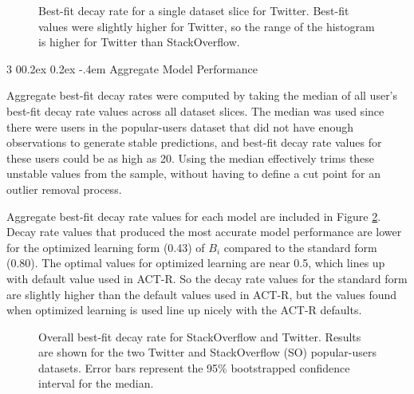 \documentclass[man,floatsintext,donotrepeattitle]{apa6}
\makeatletter
\renewcommand{\subsubsection}{%
  \@startsection
  {subsubsection}%
  {3}%
  {\parindent}%
  {0\baselineskip \@plus 0.2ex \@minus 0.2ex}%
  {-.4em}%
  {\normalfont\normalsize\bfseries\addperi}}
\makeatother
\begin{document}
\begin{figure}[!htbp]
  {%
    \setlength{\fboxsep}{0pt}%
    \setlength{\fboxrule}{1pt}%
    \hfill
    \hfill
    \caption{
      Best-fit decay rate for a single dataset slice for Twitter.
      Best-fit values were slightly higher for Twitter, so the range of the histogram is higher for Twitter than StackOverflow.
  }
    \label{figPriorTwitterHistDsOL}
  }%
\end{figure}

\subsubsection{Aggregate Model Performance}

Aggregate best-fit decay rates were computed by taking the median of all user's best-fit decay rate values across all dataset slices.
The median was used since there were users in the popular-users dataset that did not have enough observations to generate stable predictions, and best-fit decay rate values for these users could be as high as 20.
Using the median effectively trims these unstable values from the sample, without having to define a cut point for an outlier removal process.

Aggregate best-fit decay rate values for each model are included in Figure \ref{figPriorDecay}.
Decay rate values that produced the most accurate model performance are lower for the optimized learning form (\num{.43}) of $B_{i}$ compared to the standard form (\num{.80}).
The optimal values for optimized learning are near \num{0.5}, which lines up with default value used in ACT-R.
So the decay rate values for the standard form are slightly higher than the default values used in ACT-R, but the values found when optimized learning is used line up nicely with the ACT-R defaults.

\begin{figure}[!htbp]
  \caption{
  Overall best-fit decay rate for StackOverflow and Twitter.
  Results are shown for the two Twitter and StackOverflow (SO) popular-users datasets.
  Error bars represent the 95\% bootstrapped confidence interval for the median.
}
  \label{figPriorDecay}
\end{figure}
\end{document}
